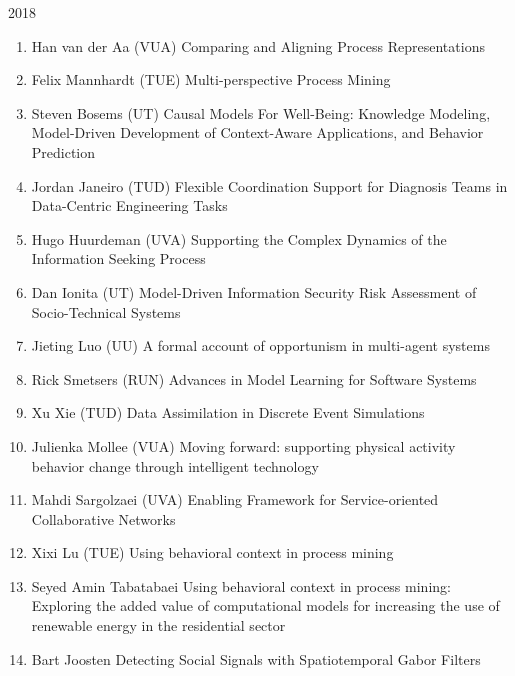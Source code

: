 \begin{multicols}{2}
\begin{scriptsize}
\vspace{0.2cm}
2018
\vspace{0.2cm}
\begin{enumerate}[leftmargin=*,noitemsep,topsep=0pt,parsep=1pt,partopsep=0pt]
\renewcommand{\labelenumi}{2018-\arabic{enumi}}
\item Han van der Aa (VUA) Comparing and Aligning Process Representations
\item Felix Mannhardt (TUE) Multi-perspective Process Mining
\item Steven Bosems (UT) Causal Models For Well-Being: Knowledge Modeling, Model-Driven Development of Context-Aware Applications, and Behavior Prediction
\item Jordan Janeiro (TUD) Flexible Coordination Support for Diagnosis Teams in Data-Centric Engineering Tasks
\item Hugo Huurdeman (UVA) Supporting the Complex Dynamics of the Information Seeking Process
\item Dan Ionita (UT) Model-Driven Information Security Risk Assessment of Socio-Technical Systems
\item Jieting Luo (UU) A formal account of opportunism in multi-agent systems
\item Rick Smetsers (RUN) Advances in Model Learning for Software Systems
\item Xu Xie (TUD) Data Assimilation in Discrete Event Simulations	
\item Julienka Mollee (VUA) Moving forward: supporting physical activity behavior change through intelligent technology
\item Mahdi Sargolzaei (UVA) Enabling Framework for Service-oriented Collaborative Networks
\item Xixi Lu (TUE) Using behavioral context in process mining
\item Seyed Amin Tabatabaei Using behavioral context in process mining: Exploring the added value of computational models for increasing the use of renewable energy in the residential sector
\item Bart Joosten Detecting Social Signals with Spatiotemporal Gabor Filters
\end{enumerate}	
\end{scriptsize}
\end{multicols}
\restoregeometry